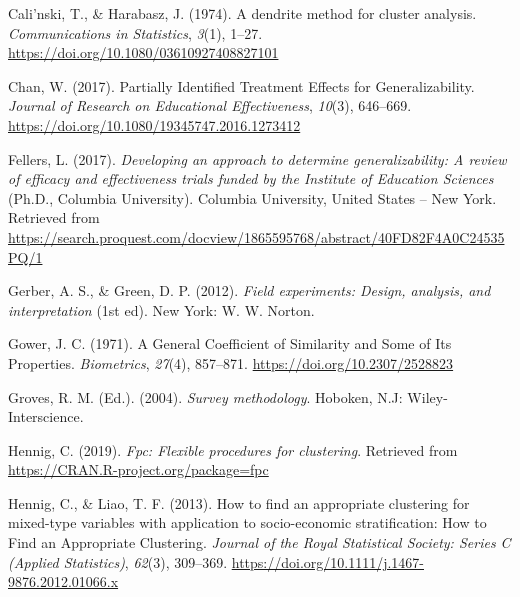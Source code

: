 \documentclass[
  man,floatsintext]{apa6}
\newlength{\cslhangindent}
\newlength{\cslentryspacingunit} %
\newenvironment{CSLReferences}[2] %
 {%
  \setlength{\parindent}{0pt}
  \ifodd #1
  \let\oldpar\par
  \def\par{\hangindent=\cslhangindent\oldpar}
  \fi
  \setlength{\parskip}{#2\cslentryspacingunit}
 }%
 {}
\begin{document}
\hypertarget{refs}{}
\begin{CSLReferences}{1}{0}
\leavevmode{}%
Cali'nski, T., \& Harabasz, J. (1974). A dendrite method for cluster analysis. \emph{Communications in Statistics}, \emph{3}(1), 1--27. \url{https://doi.org/10.1080/03610927408827101}

\leavevmode{}%
Chan, W. (2017). Partially {Identified} {Treatment} {Effects} for {Generalizability}. \emph{Journal of Research on Educational Effectiveness}, \emph{10}(3), 646--669. \url{https://doi.org/10.1080/19345747.2016.1273412}

\leavevmode{}%
Fellers, L. (2017). \emph{Developing an approach to determine generalizability: {A} review of efficacy and effectiveness trials funded by the {Institute} of {Education Sciences}} (Ph.D., Columbia University). Columbia University, United States -- New York. Retrieved from \url{https://search.proquest.com/docview/1865595768/abstract/40FD82F4A0C24535PQ/1}

\leavevmode{}%
Gerber, A. S., \& Green, D. P. (2012). \emph{Field experiments: Design, analysis, and interpretation} (1st ed). New York: W. W. Norton.

\leavevmode{}%
Gower, J. C. (1971). A {General Coefficient} of {Similarity} and {Some} of {Its Properties}. \emph{Biometrics}, \emph{27}(4), 857--871. \url{https://doi.org/10.2307/2528823}

\leavevmode{}%
Groves, R. M. (Ed.). (2004). \emph{Survey methodology}. Hoboken, N.J: Wiley-Interscience.

\leavevmode{}%
Hennig, C. (2019). \emph{Fpc: Flexible procedures for clustering}. Retrieved from \url{https://CRAN.R-project.org/package=fpc}

\leavevmode{}%
Hennig, C., \& Liao, T. F. (2013). How to find an appropriate clustering for mixed-type variables with application to socio-economic stratification: {How} to {Find} an {Appropriate Clustering}. \emph{Journal of the Royal Statistical Society: Series C (Applied Statistics)}, \emph{62}(3), 309--369. \url{https://doi.org/10.1111/j.1467-9876.2012.01066.x}


\end{CSLReferences}
\end{document}
